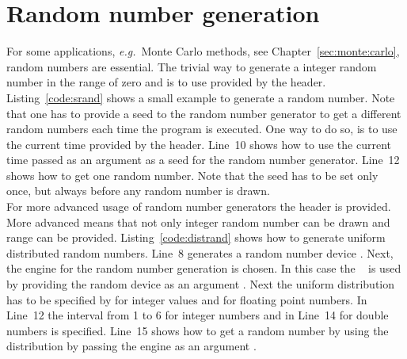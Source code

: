 


\section{Random number generation}
\label{sec:random:numbers}
For some applications, \emph{e.g.}\ Monte Carlo methods, see Chapter~\ref{sec:monte:carlo}, random numbers are essential. The trivial way to generate a integer random number in the range of zero and  is to use  provided by the  header. Listing~\ref{code:srand} shows a small example to generate a random number. Note that one has to provide a seed to the random number generator to get a different random numbers each time the program is executed. One way to do so, is to use the current time  provided by the  header. Line~10 shows how to use the current time passed as an argument  as a seed for the random number generator. Line~\mbox{12} shows how to get one random number. Note that the seed has to be set only once, but always before any random number is drawn.\\



For more advanced usage of random number generators the  header is provided. More advanced means that not only integer random number can be drawn and range can be provided. Listing~\ref{code:distrand} shows how to generate uniform distributed random numbers. Line~8 generates a random number device . Next, the engine for the random number generation is chosen. In this case the ~\cite{matsumoto1998mersenne} is used by providing the random device as an argument . Next the uniform distribution has to be specified by  for integer values and  for floating point numbers. In Line~12 the interval from 1 to 6 for integer numbers and in Line~14 for double numbers is specified. Line~15 shows how to get a random number by using the distribution by passing the engine as an argument .


